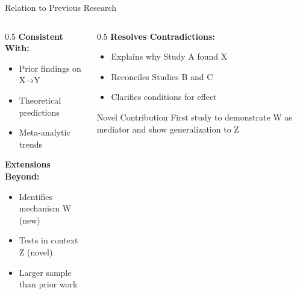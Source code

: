 \documentclass[aspectratio=169,11pt]{beamer}
\begin{document}
\begin{frame}{Relation to Previous Research}
  \begin{columns}[T]
    
    \begin{column}{0.5\textwidth}
      \textbf{Consistent With:}
      \begin{itemize}
        \item Prior findings on X→Y \cite{jones2020}
        \item Theoretical predictions \cite{smith2019}
        \item Meta-analytic trends \cite{meta2021}
      \end{itemize}
      
      \vspace{0.5cm}
      
      \textbf{Extensions Beyond:}
      \begin{itemize}
        \item Identifies mechanism W (new)
        \item Tests in context Z (novel)
        \item Larger sample than prior work
      \end{itemize}
    \end{column}
    
    \begin{column}{0.5\textwidth}
      \textbf{Resolves Contradictions:}
      \begin{itemize}
        \item Explains why Study A found X
        \item Reconciles Studies B and C
        \item Clarifies conditions for effect
      \end{itemize}
      
      \vspace{0.5cm}
      
      \begin{alertblock}{Novel Contribution}
        First study to demonstrate W as mediator and show generalization to Z
      \end{alertblock}
    \end{column}
    
  \end{columns}
\end{frame}
\end{document}

